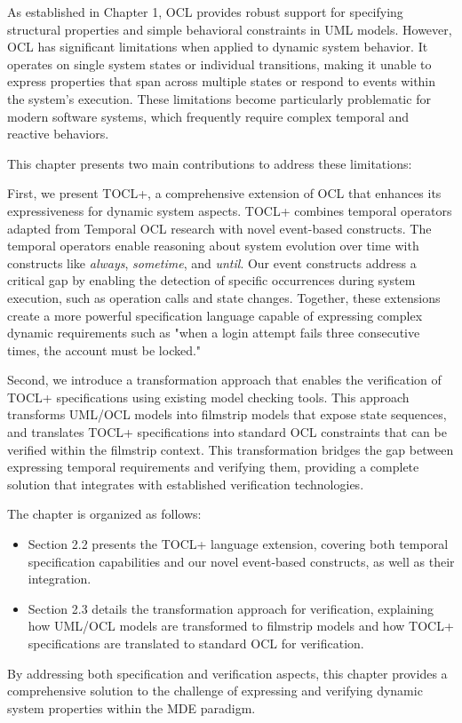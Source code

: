 As established in Chapter 1, OCL provides robust support for specifying structural properties 
and simple behavioral constraints in UML models. However, OCL has significant limitations 
when applied to dynamic system behavior. It operates on single system states or individual 
transitions, making it unable to express properties that span across multiple states or 
respond to events within the system's execution. These limitations become particularly 
problematic for modern software systems, which frequently require complex temporal and 
reactive behaviors.

This chapter presents two main contributions to address these limitations:

First, we present TOCL+, a comprehensive extension of OCL that enhances its expressiveness 
for dynamic system aspects. TOCL+ combines temporal operators adapted from Temporal OCL 
research with novel event-based constructs. The temporal operators enable reasoning about 
system evolution over time with constructs like \textit{always}, \textit{sometime}, and 
\textit{until}. Our event constructs address a critical gap by enabling the detection of 
specific occurrences during system execution, such as operation calls and state changes. 
Together, these extensions create a more powerful specification language capable of expressing 
complex dynamic requirements such as "when a login attempt fails three consecutive times, 
the account must be locked."

Second, we introduce a transformation approach that enables the verification of TOCL+ 
specifications using existing model checking tools. This approach transforms UML/OCL models 
into filmstrip models that expose state sequences, and translates TOCL+ specifications into 
standard OCL constraints that can be verified within the filmstrip context. This transformation 
bridges the gap between expressing temporal requirements and verifying them, providing a 
complete solution that integrates with established verification technologies.

The chapter is organized as follows:
\begin{itemize}
    \item Section 2.2 presents the TOCL+ language extension, covering both temporal 
    specification capabilities and our novel event-based constructs, as well as their 
    integration.
    
    \item Section 2.3 details the transformation approach for verification, explaining 
    how UML/OCL models are transformed to filmstrip models and how TOCL+ specifications 
    are translated to standard OCL for verification.
\end{itemize}

By addressing both specification and verification aspects, this chapter provides a 
comprehensive solution to the challenge of expressing and verifying dynamic system properties 
within the MDE paradigm.